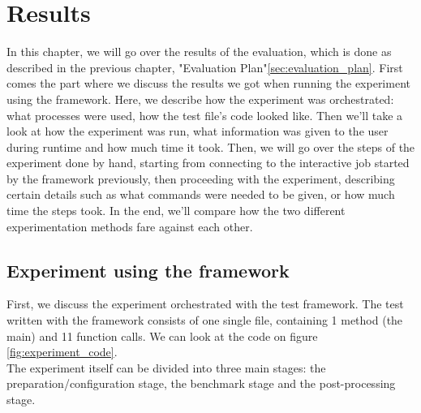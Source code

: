 




\chapter{Results}
\label{Chapter6}

In this chapter, we will go over the results of the evaluation, which
is done as described in the previous chapter, "Evaluation
Plan"\ref{sec:evaluation_plan}. First comes the part where we discuss the
results we got when running the experiment using the framework. Here,
we describe how the experiment was orchestrated: what processes were
used, how the test file's code looked like. Then we'll take a look at
how the experiment was run, what information was given to the user
during runtime and how much time it took. Then, we will go over the
steps of the experiment done by hand, starting from connecting to the
interactive job started by the framework previously, then proceeding
with the experiment, describing certain details such as what commands
were needed to be given, or how much time the steps took. In the end,
we'll compare how the two different experimentation methods fare
against each other.
\section{Experiment using the framework}
First, we discuss the experiment orchestrated with the test
framework. The test written with the framework consists of one single
file, containing 1 method (the main) and 11 function calls. We can
look at the code on figure \ref{fig:experiment_code}.\\
The experiment itself can be divided into three main stages: the
preparation/configuration stage, the benchmark stage and the
post-processing stage.

